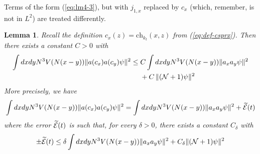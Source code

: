 \documentclass[11pt,a4paper,DIV11]{scrartcl}	%
\newtheorem{lemma}[thm]{Lemma}
\newcommand{\wt}{\widetilde}
\newcommand{\cE}{{\cal E}}
\newcommand{\cN}{{\cal N}}
\begin{document}
Terms of the form (\ref{eq:lm4-3}), but with $j_{1,x}$ replaced by $c_x$ (which, remember, is not in $L^2$) are treated differently.
\begin{lemma}\label{lm:4b}
Recall the definition $c_x (z) = \text{ch}_{k_t} (x,z)$ from (\ref{eq:def-csprx}). Then there exists a constant $C>0$ with
\begin{equation}\label{eq:lm4b-1}
\begin{split}
\int dx dy N^3 V(N(x-y)) \| a (c_x) a(c_y) \psi \|^2 \leq \; &C \int dx dy N^3 V (N(x-y)) \| a_x a_y \psi \|^2 \\ &+ C\, \| (\cN+1) \psi \|^2 \end{split} \end{equation}
More precisely, we have 
\begin{equation}\label{eq:lm4b-2} \int dx dy N^3 V(N(x-y)) \| a (c_x) a (c_y) \psi \|^2 = \int dx dy N^3 V(N (x-y)) \| a_x a_y \psi \|^2 + \wt{\cE} (t) \end{equation}
where the error $\wt{\cE} (t)$ is such that, for every $\delta > 0$, there exists a constant $C_\delta$ 
with
\[ \pm \wt{\cE} (t) \leq \delta \int dx dy N^3 V (N (x-y)) \| a_x a_y \psi \|^2 + C_\delta \| (\cN+1) \psi \|^2 \]
\end{lemma}
\end{document}
